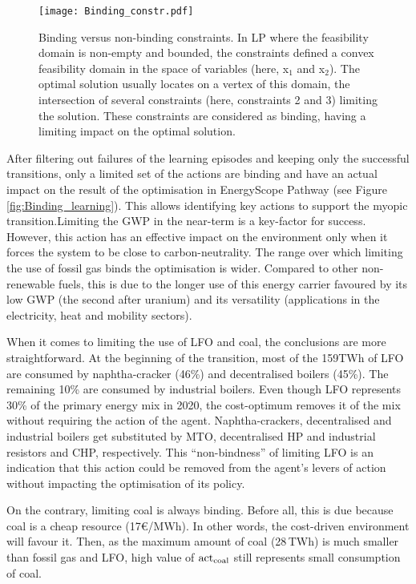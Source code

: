 \begin{figure}[!htbp]
\centering
\texttt{[image: Binding\_constr.pdf]}
\caption{Binding versus non-binding constraints. In \gls{LP} where the feasibility domain is non-empty and bounded, the constraints defined a convex feasibility domain in the space of variables (here, x$_1$ and x$_2$). The optimal solution usually locates on a vertex of this domain, \ie the intersection of several constraints (here, constraints 2 and 3) limiting the solution. These constraints are considered as binding, \ie having a limiting impact on the optimal solution.}
\label{fig:Binding_constr}
\end{figure} 

After filtering out failures of the learning episodes and keeping only the successful transitions, only a limited set of the actions are binding and have an actual impact on the result of the optimisation in EnergyScope Pathway (see Figure \ref{fig:Binding_learning}). This allows identifying key actions to support the myopic transition.Limiting the \gls{GWP} in the near-term is a key-factor for success. However, this action has an effective impact on the environment only when it forces the system to be close to carbon-neutrality. The range over which limiting the use of fossil gas binds the optimisation is wider. Compared to other non-renewable fuels, this is due to the longer use of this energy carrier favoured by its low \gls{GWP} (the second after uranium) and its versatility (applications in the electricity, heat and mobility sectors).

When it comes to limiting the use of \gls{LFO} and coal, the conclusions are more straightforward. At the beginning of the transition, most of the 159TWh of \gls{LFO} are consumed by naphtha-cracker (46\%) and decentralised boilers (45\%). The remaining 10\% are consumed by industrial boilers. Even though \gls{LFO} represents  30\% of the primary energy mix in 2020, the cost-optimum removes it of the mix without requiring the action of the agent. Naphtha-crackers, decentralised and industrial boilers get substituted by \gls{MTO}, decentralised \gls{HP} and industrial resistors and \gls{CHP}, respectively.  This ``non-bindness'' of limiting \gls{LFO} is an indication that this action could be removed from the agent's levers of action without impacting the optimisation of its policy.

On the contrary, limiting coal is always binding. Before all, this is due because coal is a cheap resource (17€/MWh). In other words, the cost-driven environment will favour it. Then, as the maximum amount of coal (28\,TWh) is much smaller than fossil gas and \gls{LFO}, high value of $\mathrm{act}\textsubscript{coal}$ still represents small consumption of coal.

